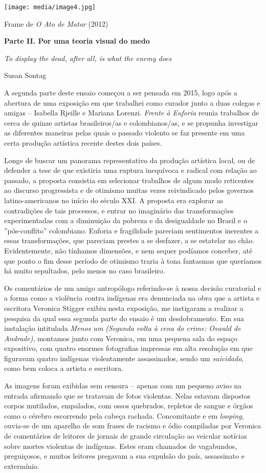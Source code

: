 \texttt{[image: media/image4.jpg]}

Frame de \emph{O Ato de Matar} (2012)

\textbf{Parte II. Por uma teoria visual do medo}

\emph{To display the dead, after all, is what the enemy does}

Susan Sontag

A segunda parte deste ensaio começou a ser pensada em 2015, logo após a
abertura de uma exposição em que trabalhei como curador junto a duas
colegas e amigas -- Isabella Rjeille e Mariana Lorenzi. \emph{Frente à
Euforia} reunia trabalhos de cerca de quinze artistas brasileiros/as e
colombianos/as, e se propunha investigar as diferentes maneiras pelas
quais o passado violento se faz presente em uma certa produção artística
recente destes dois países.

Longe de buscar um panorama representativo da produção artística local,
ou de defender a tese de que existiria uma ruptura inequívoca e radical
com relação ao passado, a proposta consistia em selecionar trabalhos de
algum modo reticentes ao discurso progressista e de otimismo muitas
vezes reivindicado pelos governos latino-americanos no início do século
XXI. A proposta era explorar as contradições de tais processos, e entrar
no imaginário das transformações experimentadas com a diminuição da
pobreza e da desigualdade no Brasil e o ''pós-conflito'' colombiano.
Euforia e fragilidade pareciam sentimentos inerentes a essas
transformações, que pareciam prestes a se desfazer, a se estatelar no
chão. Evidentemente, não tínhamos dimensões, e nem sequer podíamos
conceber, até que ponto o fim desse período de otimismo traria à tona
fantasmas que queríamos há muito sepultados, pelo menos no caso
brasileiro.

Os comentários de um amigo antropólogo referindo-se à nossa decisão
curatorial e a forma como a violência contra indígenas era denunciada na
obra que a artista e escritora Veronica Stigger exibiu nesta exposição,
me instigaram a realizar a pesquisa da qual essa segunda parte do ensaio
é um desdobramento. Em sua instalação intitulada \emph{Menos um (Segunda
volta à cena do crime: Oswald de Andrade)}, montamos junto com Veronica,
em uma pequena sala do espaço expositivo, com quatro enormes fotografias
impressas em alta resolução em que figuravam quatro indígenas
violentamente assassinados, sendo um \emph{suicidado}, como bem coloca a
artista e escritora.

As imagens foram exibidas sem censura -- apenas com um pequeno aviso na
entrada afirmando que se tratavam de fotos violentas. Nelas estavam
dispostos corpos mutilados, empalados, com ossos quebrados, repletos de
sangue e órgãos como o cérebro escorrendo pela cabeça rachada.
Concomitante e em \emph{looping}, ouvia-se de um aparelho de som frases
de racismo e ódio compiladas por Veronica de comentários de leitores de
jornais de grande circulação ao veicular notícias sobre mortes violentas
de indígenas. Estes eram chamados de vagabundos, preguiçosos, e muitos
leitores pregavam a sua expulsão do país, assassinato e extermínio.


